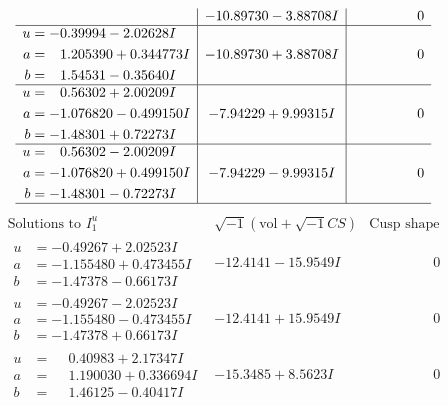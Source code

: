 \documentclass[1p]{elsarticle_modified}
\theoremstyle{definition}
\newcommand{\I}{\sqrt{-1}}
\begin{document}
$$\begin{array}{c|c|c}
 & -10.89730 - 3.88708 I & \phantom{-0.000000 } 0 \\ \hline\begin{aligned}
u &= -0.39994 - 2.02628 I \\
a &= \phantom{-}1.205390 + 0.344773 I \\
b &= \phantom{-}1.54531 - 0.35640 I\end{aligned}
 & -10.89730 + 3.88708 I & \phantom{-0.000000 } 0 \\ \hline\begin{aligned}
u &= \phantom{-}0.56302 + 2.00209 I \\
a &= -1.076820 - 0.499150 I \\
b &= -1.48301 + 0.72273 I\end{aligned}
 & -7.94229 + 9.99315 I & \phantom{-0.000000 } 0 \\ \hline\begin{aligned}
u &= \phantom{-}0.56302 - 2.00209 I \\
a &= -1.076820 + 0.499150 I \\
b &= -1.48301 - 0.72273 I\end{aligned}
 & -7.94229 - 9.99315 I & \phantom{-0.000000 } 0\\
 \hline 
 \end{array}$$\newpage$$\begin{array}{c|c|c}  
\text{Solutions to }I^u_{1}& \I (\text{vol} + \sqrt{-1}CS) & \text{Cusp shape}\\
 \hline 
\begin{aligned}
u &= -0.49267 + 2.02523 I \\
a &= -1.155480 + 0.473455 I \\
b &= -1.47378 - 0.66173 I\end{aligned}
 & -12.4141 - 15.9549 I & \phantom{-0.000000 } 0 \\ \hline\begin{aligned}
u &= -0.49267 - 2.02523 I \\
a &= -1.155480 - 0.473455 I \\
b &= -1.47378 + 0.66173 I\end{aligned}
 & -12.4141 + 15.9549 I & \phantom{-0.000000 } 0 \\ \hline\begin{aligned}
u &= \phantom{-}0.40983 + 2.17347 I \\
a &= \phantom{-}1.190030 + 0.336694 I \\
b &= \phantom{-}1.46125 - 0.40417 I\end{aligned}
 & -15.3485 + 8.5623 I & \phantom{-0.000000 } 0 \\ \hline\begin{aligned}

\end{aligned}
\end{array}$$
\end{document}
